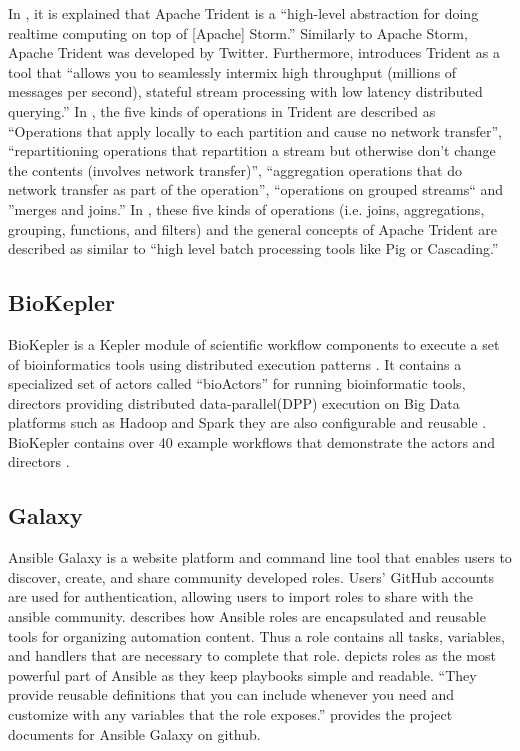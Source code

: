    In \cite{www-trident-tutorial}, it is explained that Apache Trident 
   is a ``high-level abstraction for doing realtime computing on top of 
   [Apache] Storm.'' Similarly to Apache Storm, Apache Trident was 
   developed by Twitter. Furthermore, \cite{www-trident-tutorial} 
   introduces Trident as a tool that ``allows you to seamlessly intermix 
   high throughput (millions of messages per second), stateful stream 
   processing with low latency distributed querying.'' In 
   \cite{www-trident-overview}, the five kinds of operations in 
   Trident are described as ``Operations that apply locally to each 
   partition and cause no network transfer'', ``repartitioning operations 
   that repartition a stream but otherwise don't change the contents 
   (involves network transfer)'', ``aggregation operations that do 
   network transfer as part of the operation'', ``operations on grouped 
   streams`` and ''merges and joins.'' In \cite{www-trident-tutorial}, 
   these five kinds of operations (i.e. joins, aggregations, grouping, 
   functions, and filters) and the general concepts of Apache Trident 
   are described as similar to ``high level batch processing tools like 
   Pig or Cascading.''

\pv

\subsection{BioKepler}
    
    BioKepler is a Kepler module of scientific workflow components to
    execute a set of bioinformatics tools using distributed execution
    patterns \cite{www-biokepler}. It contains a specialized set of
    actors called ``bioActors'' for running bioinformatic tools,
    directors providing distributed data-parallel(DPP) execution on
    Big Data platforms such as Hadoop and Spark they are also
    configurable and reusable \cite{www-biokepler-demos}. BioKepler
    contains over 40 example workflows that demonstrate the actors and
    directors \cite{bioActors}.

    \pv
    
\subsection{Galaxy \vc}

    Ansible Galaxy is a website platform and command line tool that
    enables users to discover, create, and share community developed
    roles. Users' GitHub accounts are used for authentication,
    allowing users to import roles to share with the ansible
    community. \cite{www-galaxy-ansible} describes how Ansible roles
    are encapsulated and reusable tools for organizing automation
    content. Thus a role contains all tasks, variables, and handlers
    that are necessary to complete that
    role. \cite{Ansible-book-2016} depicts roles as the most powerful
    part of Ansible as they keep playbooks simple and readable. ``They
    provide reusable definitions that you can include whenever you
    need and customize with any variables that the role exposes.''
    \cite{www-github-galaxy} provides the project documents for
    Ansible Galaxy on github.


